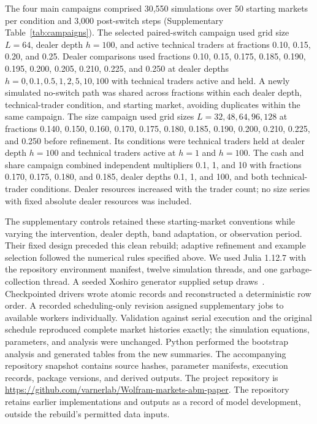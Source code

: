 The four main campaigns comprised 30,550 simulations over 50 starting
markets per condition and 3,000 post-switch steps
(Supplementary Table~\ref{tab:campaigns}). The selected paired-switch
campaign used grid size $L=64$, dealer depth $h=100$, and active
technical traders at fractions
0.10, 0.15, 0.20, and 0.25. Dealer comparisons used fractions 0.10, 0.15,
0.175, 0.185, 0.190, 0.195, 0.200, 0.205, 0.210, 0.225, and 0.250 at
dealer depths $h=0,0.1,0.5,1,2,5,10,100$ with technical traders active
and held.
A newly simulated no-switch path was shared across fractions within each
dealer depth, technical-trader condition, and starting market, avoiding
duplicates
within the same campaign. The size campaign used grid sizes
$L=32,48,64,96,128$ at
fractions 0.140, 0.150, 0.160, 0.170, 0.175, 0.180, 0.185, 0.190,
0.200, 0.210, 0.225, and 0.250 before refinement. Its conditions were
technical traders held at dealer depth $h=100$ and technical traders
active at $h=1$ and $h=100$. The cash and share campaign combined
independent multipliers 0.1, 1, and 10 with fractions 0.170, 0.175,
0.180, and
0.185, dealer depths 0.1, 1, and 100, and both technical-trader
conditions. Dealer
resources increased with the trader count; no size series with fixed
absolute dealer resources was included.

The supplementary controls retained these starting-market conventions
while varying the intervention, dealer depth, band adaptation, or
observation period. Their fixed design preceded this clean rebuild;
adaptive refinement and example selection followed the numerical rules
specified above. We used Julia 1.12.7 with the repository environment
manifest, twelve simulation threads, and one garbage-collection thread.
A seeded Xoshiro generator supplied setup draws~\cite{blackman2021scrambled}.
Checkpointed drivers wrote atomic records and reconstructed a deterministic
row order. A recorded scheduling-only revision assigned supplementary jobs
to available workers individually. Validation against serial execution
and the original schedule reproduced complete market histories exactly;
the simulation equations, parameters, and analysis were unchanged. Python performed the bootstrap analysis and generated tables
from the new summaries. The accompanying repository snapshot contains source hashes, parameter
manifests, execution records, package versions, and derived outputs.
The project repository is
\url{https://github.com/varnerlab/Wolfram-markets-abm-paper}.
The repository retains earlier implementations and outputs as a record
of model development, outside the rebuild's permitted data inputs.

